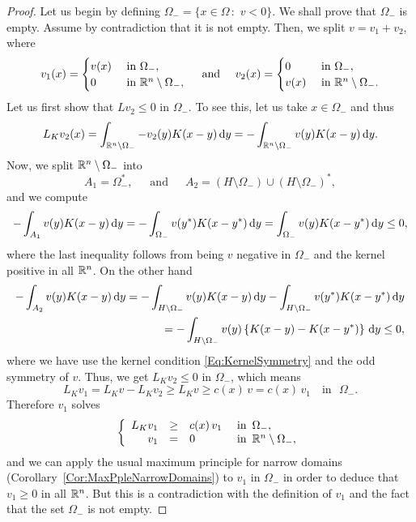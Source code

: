 \begin{proof}
	Let us begin by defining $\Omega_- = \{x\in \Omega \,:\,\, v<0\}$. We shall prove that $\Omega_-$ is empty. Assume by contradiction that it is not empty. Then, we split $ v = v_1+v_2$, where
	\begin{equation*}
	v_1(x) =
	\begin{cases}
	v(x)  &\textrm{ in } \Omega_-,\\
	0 &\textrm{ in } \mathbb{R}^n\setminus\Omega_-,
	\end{cases}
	\quad \text{ and } \quad
	v_2(x) =
	\begin{cases}
	0  &\textrm{ in } \Omega_-,\\
	v(x) &\textrm{ in } \mathbb{R}^n\setminus\Omega_-.
	\end{cases}
	\end{equation*}
	Let us first show that $Lv_2\leq 0$ in $\Omega_-$. To see this, let us take $x\in\Omega_-$ and thus
	$$
	L_K v_2(x) = \int_{\mathbb{R}^n\setminus\Omega_-} -v_2(y)K(x-y) \,\mathrm{d} y = -\int_{\mathbb{R}^n\setminus\Omega_-} v(y)K(x-y) \,\mathrm{d} y.
	$$
	Now, we split $\mathbb{R}^n\setminus\Omega_-$ into
	$$
	A_1 = \Omega_-^*,\,\,\,\,\,\,\,\text{ and }\,\,\,\,\,\,\, A_2 = \left(H\setminus\Omega_-\right)\cup\left(H\setminus\Omega_-\right)^*,
	$$
	and we compute
	\begin{align*}
	-\int_{A_1} v(y)K(x-y) \,\mathrm{d} y = -\int_{\Omega_-} v(y^*)K(x-y^*) \,\mathrm{d} y  = \int_{\Omega_-} v(y)K(x-y^*) \,\mathrm{d} y \leq 0,
	\end{align*}
	where the last inequality follows from being $v$ negative in $\Omega_-$ and the kernel positive in all $\mathbb{R}^n$.
	On the other hand
	\begin{align*}
	-\int_{A_2} v(y)K(x-y) \,\mathrm{d} y = -\int_{H\setminus\Omega_-} v(y)K(x-y) \,\mathrm{d} y  -\int_{H\setminus\Omega_-} v(y^*)K(x-y^*) \,\mathrm{d} y \\
	= -\int_{H\setminus\Omega_-} v(y)\left\{K(x-y)-K(x-y^*)\right\} \,\mathrm{d} y \leq 0,
	\end{align*}
	where we have use the kernel condition \eqref{Eq:KernelSymmetry} and the odd symmetry of $v$. Thus, we get $L_K v_2 \leq 0$ in $\Omega_-$, which means
	$$ L_K v_1 = L_K v-L_K v_2 \geq L_K v \geq c(x)\,v = c(x)\,v_1 \,\,\,\,\text{ in }\,\,\Omega_-. $$
	Therefore $v_1$ solves
	\begin{equation*}
	\left\{\begin{array}{rcll}
	L_K v_1 &\geq& c(x)\,v_1   &\textrm{ in } \,\Omega_-,\\
	v_1 &=& 0 &\textrm{ in }\,\mathbb{R}^n\setminus\Omega_-,
	\end{array} \right.
	\end{equation*}
	and we can apply the usual maximum principle for narrow domains (Corollary~\ref{Cor:MaxPpleNarrowDomains}) to $v_1$ in $\Omega_-$ in order to deduce that $v_1\geq 0$ in all $\mathbb{R}^n$. But this is a contradiction with the definition of $v_1$ and the fact that the set $\Omega_-$ is not empty.
\end{proof}


